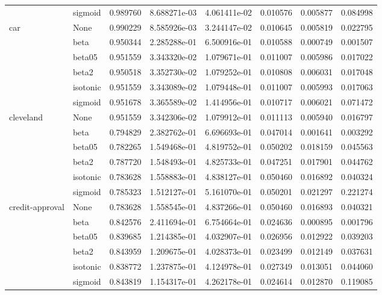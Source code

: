 \begin{tabular}{llrrrrrr}
        & sigmoid &  0.989760 &  8.688271e-03 &  4.061411e-02 &  0.010576 &  0.005877 &  0.084998 \\
car & None &  0.990229 &  8.585926e-03 &  3.244147e-02 &  0.010645 &  0.005819 &  0.022795 \\
        & beta &  0.950344 &  2.285288e-01 &  6.500916e-01 &  0.010588 &  0.000749 &  0.001507 \\
        & beta05 &  0.951559 &  3.343320e-02 &  1.079671e-01 &  0.011007 &  0.005986 &  0.017022 \\
        & beta2 &  0.950518 &  3.352730e-02 &  1.079252e-01 &  0.010808 &  0.006031 &  0.017048 \\
        & isotonic &  0.951559 &  3.343089e-02 &  1.079448e-01 &  0.011007 &  0.005993 &  0.017063 \\
        & sigmoid &  0.951678 &  3.365589e-02 &  1.414956e-01 &  0.010717 &  0.006021 &  0.071472 \\
cleveland & None &  0.951559 &  3.342306e-02 &  1.079912e-01 &  0.011113 &  0.005940 &  0.016797 \\
        & beta &  0.794829 &  2.382762e-01 &  6.696693e-01 &  0.047014 &  0.001641 &  0.003292 \\
        & beta05 &  0.782265 &  1.549468e-01 &  4.819752e-01 &  0.050202 &  0.018159 &  0.045563 \\
        & beta2 &  0.787720 &  1.548493e-01 &  4.825733e-01 &  0.047251 &  0.017901 &  0.044762 \\
        & isotonic &  0.783628 &  1.558883e-01 &  4.838127e-01 &  0.050460 &  0.016892 &  0.040324 \\
        & sigmoid &  0.785323 &  1.512127e-01 &  5.161070e-01 &  0.050201 &  0.021297 &  0.221274 \\
credit-approval & None &  0.783628 &  1.558545e-01 &  4.837266e-01 &  0.050460 &  0.016893 &  0.040321 \\
        & beta &  0.842576 &  2.411694e-01 &  6.754664e-01 &  0.024636 &  0.000895 &  0.001796 \\
        & beta05 &  0.839685 &  1.214385e-01 &  4.032907e-01 &  0.026956 &  0.012922 &  0.039203 \\
        & beta2 &  0.843959 &  1.209675e-01 &  4.028373e-01 &  0.023499 &  0.012149 &  0.037631 \\
        & isotonic &  0.838772 &  1.237875e-01 &  4.124978e-01 &  0.027349 &  0.013051 &  0.044060 \\
        & sigmoid &  0.843819 &  1.154317e-01 &  4.262178e-01 &  0.024614 &  0.012870 &  0.119085 \\

\end{tabular}
